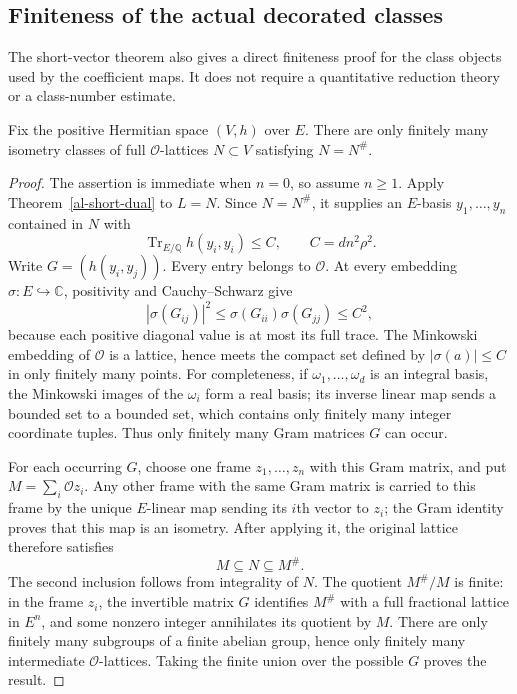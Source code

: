 \subsection{Finiteness of the actual decorated classes}

The short-vector theorem also gives a direct finiteness proof for
the class objects used by the coefficient maps. It does not require
a quantitative reduction theory or a class-number estimate.

\begin{theorem}
\label{al-finite-classes}
Fix the positive Hermitian space $(V,h)$ over $E$.
There are only finitely many isometry classes of full
$\mathcal O$-lattices $N\subset V$ satisfying $N=N^\#$.
\end{theorem}
\begin{proof}
The assertion is immediate when $n=0$, so assume $n\geq1$.
Apply Theorem~\ref{al-short-dual} to $L=N$. Since $N=N^\#$,
it supplies an $E$-basis $y_1,\ldots,y_n$ contained in $N$ with
\[
       \operatorname{Tr}_{E/\mathbb Q}h(y_i,y_i)
                      \leq C,\qquad C=dn^2\rho^2.
\]
Write $G=(h(y_i,y_j))$. Every entry belongs to $\mathcal O$.
At every embedding $\sigma:E\hookrightarrow\mathbb C$,
positivity and Cauchy--Schwarz give
\[
 |\sigma(G_{ij})|^2
       \leq \sigma(G_{ii})\sigma(G_{jj})\leq C^2,
\]
because each positive diagonal value is at most its full trace.
The Minkowski embedding of $\mathcal O$ is a lattice, hence
meets the compact set defined by $|\sigma(a)|\leq C$ in
only finitely many points. For completeness, if
$\omega_1,\ldots,\omega_d$ is an integral basis, the
Minkowski images of the $\omega_i$ form a real basis; its
inverse linear map sends a bounded set to a bounded set,
which contains only finitely many integer coordinate tuples.
Thus only finitely many Gram matrices $G$ can occur.

For each occurring $G$, choose one frame $z_1,\ldots,z_n$
with this Gram matrix, and put
$M=\sum_i\mathcal O z_i$. Any other frame with the same
Gram matrix is carried to this frame by the unique
$E$-linear map sending its $i$th vector to $z_i$; the Gram
identity proves that this map is an isometry. After applying
it, the original lattice therefore satisfies
\[
                         M\subseteq N\subseteq M^\#.
\]
The second inclusion follows from integrality of $N$.
The quotient $M^\#/M$ is finite: in the frame $z_i$, the
invertible matrix $G$ identifies $M^\#$ with a full
fractional lattice in $E^n$, and some nonzero integer
annihilates its quotient by $M$. There are only finitely
many subgroups of a finite abelian group, hence only
finitely many intermediate $\mathcal O$-lattices.
Taking the finite union over the possible $G$ proves the result.
\end{proof}


